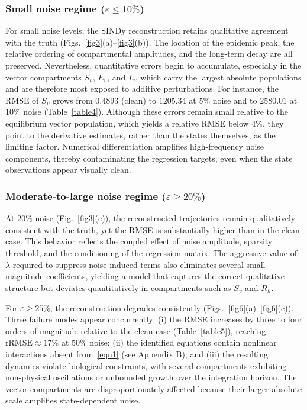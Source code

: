 \documentclass[9pt]{article}
\numberwithin{equation}{section}
\begin{document}
\subsubsection{Small noise regime \texorpdfstring{($\varepsilon \leq 10\%$)}{}}\label{sec:sindy-noisy-low}
For small noise levels, the SINDy reconstruction retains qualitative agreement with the truth (Figs.~\ref{fig3}(a)--\ref{fig3}(b)). The location of the epidemic peak, the relative ordering of compartmental amplitudes, and the long-term decay are all preserved. Nevertheless, quantitative errors begin to accumulate, especially in the vector compartments $S_v$, $E_v$, and $I_v$, which carry the largest absolute populations and are therefore most exposed to additive perturbations. For instance, the RMSE of $S_v$ grows from $0.4893$ (clean) to $1205.34$ at $5\%$ noise and to $2580.01$ at $10\%$ noise (Table~\ref{table4}). Although these errors remain small relative to the equilibrium vector population, which yields a relative RMSE below 4\%, they point to the derivative estimates, rather than the states themselves, as the limiting factor. Numerical differentiation amplifies high-frequency noise components, thereby contaminating the regression targets, even when the state observations appear visually clean.

\subsubsection{Moderate-to-large noise regime \texorpdfstring{($\varepsilon \geq 20\%$)}{}}\label{sec:sindy-noisy-high}
At $20\%$ noise (Fig.~\ref{fig3}(c)), the reconstructed trajectories remain qualitatively consistent with the truth, yet the RMSE is substantially higher than in the clean case. This behavior reflects the coupled effect of noise amplitude, sparsity threshold, and the conditioning of the regression matrix. The aggressive value of $\tilde\lambda$ required to suppress noise-induced terms also eliminates several small-magnitude coefficients, yielding a model that captures the correct qualitative structure but deviates quantitatively in compartments such as $S_v$ and $R_h$.

For $\varepsilon \geq 25\%$, the reconstruction degrades consistently (Figs.~\ref{fig6}(a)--\ref{fig6}(c)). Three failure modes appear concurrently: (i) the RMSE increases by three to four orders of magnitude relative to the clean case (Table~\ref{table5}), reaching $\mathrm{rRMSE} \approx 17\%$ at $50\%$ noise; (ii) the identified equations contain nonlinear interactions absent from~\eqref{eqn1} (see Appendix B); and (iii) the resulting dynamics violate biological constraints, with several compartments exhibiting non-physical oscillations or unbounded growth over the integration horizon. The vector compartments are disproportionately affected because their larger absolute scale amplifies state-dependent noise.
\end{document}
